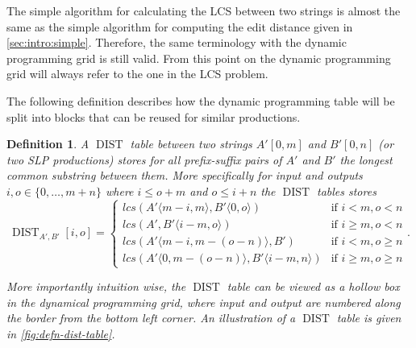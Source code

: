 \documentclass[twoside,11pt,openright]{report}
\newcommand{\DIST}{\operatorname{DIST}}
\newcommand{\substr}[3]{#1\langle #2, #3 \rangle}
\newcommand{\str}[3]{#1[#2, #3]}
\newtheorem{mydef}{Definition}
\begin{document}
The simple algorithm for calculating the LCS between two strings is almost the same as the simple algorithm for computing the edit distance given in \cref{sec:intro:simple}. Therefore, the same terminology with the dynamic programming grid is still valid. From this point on the dynamic programming grid will always refer to the one in the LCS problem.

The following definition describes how the dynamic programming table will be split into blocks that can be reused for similar productions.

\begin{mydef}
  \label{defn:dist-table}
  A $\DIST$ table between two strings $\str{A'}{0}{m}$ and $\str{B'}{0}{n}$ (or two SLP productions) stores for all prefix-suffix pairs of $A'$ and $B'$ the longest common substring between them. More specifically for input and outputs $i, o \in \{0, \dots, m + n\}$ where $i \leq o + m$ and $o \leq i + n$ the $\DIST$ tables stores
  \[
    \DIST_{A',B'}[i, o] = \left\{
    \begin{array}{ll}
      lcs(\substr{A'}{m - i}{m}, \substr{B'}{0}{o})             & \text{if } i < m, o < n \\
      lcs(A', \substr{B'}{i - m}{o})                            & \text{if } i \geq m, o < n \\
      lcs(\substr{A'}{m - i}{m - (o - n)}, B')                  & \text{if } i < m, o \geq n \\
      lcs(\substr{A'}{0}{m - (o - n)}, \substr{B'}{i - m}{n})   & \text{if } i \geq m, o \geq n
    \end{array}
  \right. .
  \]

  More importantly intuition wise, the $\DIST$ table can be viewed as a hollow box in the dynamical programming grid, where input and output are numbered along the border from the bottom left corner. An illustration of a $\DIST$ table is given in \cref{fig:defn-dist-table}.


\end{mydef}
\end{document}

